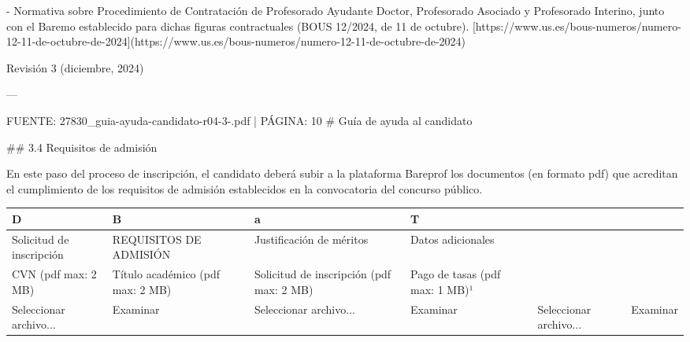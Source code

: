 \documentclass{article}
\begin{document}
\begin{itemize}
\begin{itemize}
\begin{scriptsize}
                  - Normativa sobre Procedimiento de Contratación de Profesorado Ayudante Doctor, Profesorado Asociado y Profesorado Interino, junto con el Baremo establecido para dichas figuras contractuales (BOUS 12/2024, de 11 de octubre).
                    [https://www.us.es/bous-numeros/numero-12-11-de-octubre-de-2024](https://www.us.es/bous-numeros/numero-12-11-de-octubre-de-2024)

                  Revisión 3 (diciembre, 2024)

                  ---

                  FUENTE: 27830\_guia-ayuda-candidato-r04-3-.pdf | PÁGINA: 10
                  \# Guía de ayuda al candidato

                  \#\# 3.4 Requisitos de admisión

                  En este paso del proceso de inscripción, el candidato deberá subir a la plataforma Bareprof los documentos (en formato pdf) que acreditan el cumplimiento de los requisitos de admisión establecidos en la convocatoria del concurso público.

                  \vspace{0.4cm}
                  \begin{table}[h!]\centering\renewcommand{\arraystretch}{1.3}
                    \begin{tabular}{|p{}|p{}|p{}|p{}|p{}|p{}|}\hline
                      D                        & B                                & a                                        & T                              &                        &          \\\hline
                      Solicitud de inscripción & REQUISITOS DE ADMISIÓN           & Justificación de méritos                 & Datos adicionales              &                        &          \\\hline
                      CVN (pdf max: 2 MB)      & Título académico (pdf max: 2 MB) & Solicitud de inscripción (pdf max: 2 MB) & Pago de tasas (pdf max: 1 MB)¹ &                        &          \\\hline
                      Seleccionar archivo...   & Examinar                         & Seleccionar archivo...                   & Examinar                       & Seleccionar archivo... & Examinar \\\hline
                    \end{tabular}\end{table}
                  \vspace{0.4cm}


\end{scriptsize}
\end{itemize}
\end{itemize}
\end{document}
